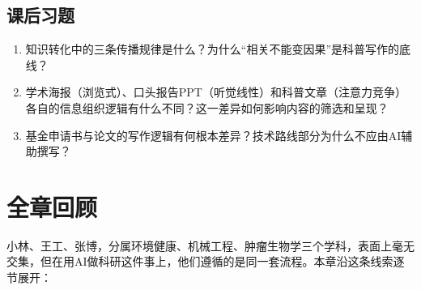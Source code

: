 \bigskip
\subsection*{课后习题}
\begin{enumerate}
\setlength{\itemsep}{6pt}

\item 知识转化中的三条传播规律是什么？为什么``相关不能变因果''是科普写作的底线？

\item 学术海报（浏览式）、口头报告PPT（听觉线性）和科普文章（注意力竞争）各自的信息组织逻辑有什么不同？这一差异如何影响内容的筛选和呈现？

\item 基金申请书与论文的写作逻辑有何根本差异？技术路线部分为什么不应由AI辅助撰写？

\end{enumerate}
\newpage

\section*{全章回顾}

小林、王工、张博，分属环境健康、机械工程、肿瘤生物学三个学科，表面上毫无交集，但在用AI做科研这件事上，他们遵循的是同一套流程。本章沿这条线索逐节展开：

